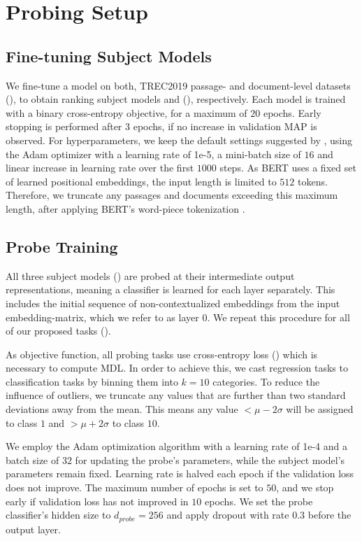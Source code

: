 \section{Probing Setup}
\label{sec:probing_setup}
\subsection{Fine-tuning Subject Models}
We fine-tune a  model on both, TREC2019 passage- and document-level datasets (), to obtain ranking subject models  and  (), respectively. Each model is trained with a binary cross-entropy objective, for a maximum of $20$ epochs. Early stopping is performed after $3$ epochs, if no increase in validation MAP is observed. For hyperparameters, we keep the default settings suggested by \cite{devlin-etal-2019-bert}, using the Adam optimizer\cite{kingma2014adam} with a learning rate of 1e-5, a mini-batch size of $16$ and linear increase in learning rate over the first $1000$ steps. As BERT uses a fixed set of learned positional embeddings, the input length is limited to $512$ tokens. Therefore, we truncate any passages and documents exceeding this maximum length, after applying BERT's word-piece tokenization \cite{Wu2016GooglesNM}.

\subsection{Probe Training}
All three subject models () are probed at their intermediate output representations, meaning a classifier is learned for each layer separately. This includes the initial sequence of non-contextualized embeddings from the input embedding-matrix, which we refer to as layer $0$. We repeat this procedure for all of our proposed tasks ().

As objective function, all probing tasks use cross-entropy loss () which is necessary to compute MDL. In order to achieve this, we cast regression tasks to classification tasks by binning them into $k=10$ categories. To reduce the influence of outliers, we truncate any values that are further than two standard deviations away from the mean. This means any value $< \mu - 2 \sigma$ will be assigned to class $1$ and $> \mu + 2 \sigma$ to class $10$.

We employ the Adam optimization algorithm \cite{kingma2014adam} with a learning rate of 1e-4 and a batch size of $32$ for updating the probe's parameters, while the subject model's parameters remain fixed. Learning rate is halved each epoch if the validation loss does not improve. The maximum number of epochs is set to $50$, and we stop early if validation loss has not improved in $10$ epochs. We set the probe classifier's hidden size to $d_{probe}=256$ and apply dropout with rate $0.3$ before the output layer.

